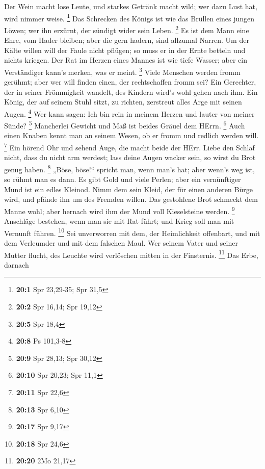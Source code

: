  Der Wein macht lose Leute, und starkes Getränk macht
wild; wer dazu Lust hat, wird nimmer weise. \footnote{\textbf{20:1} Spr
  23,29-35; Spr 31,5}  Das Schrecken des Königs ist wie
das Brüllen eines jungen Löwen; wer ihn erzürnt, der sündigt wider sein
Leben. \footnote{\textbf{20:2} Spr 16,14; Spr 19,12}  Es
ist dem Mann eine Ehre, vom Hader bleiben; aber die gern hadern, sind
allzumal Narren.  Um der Kälte willen will der Faule nicht
pflügen; so muss er in der Ernte betteln und nichts kriegen.
 Der Rat im Herzen eines Mannes ist wie tiefe Wasser; aber
ein Verständiger kann's merken, was er meint. \footnote{\textbf{20:5}
  Spr 18,4}  Viele Menschen werden fromm gerühmt; aber wer
will finden einen, der rechtschaffen fromm sei?  Ein
Gerechter, der in seiner Frömmigkeit wandelt, des Kindern wird's wohl
gehen nach ihm.  Ein König, der auf seinem Stuhl sitzt, zu
richten, zerstreut alles Arge mit seinen Augen. \footnote{\textbf{20:8}
  Ps 101,3-8}  Wer kann sagen: Ich bin rein in meinem
Herzen und lauter von meiner Sünde? \footnote{\textbf{20:9} Spr 28,13;
  Spr 30,12}  Mancherlei Gewicht und Maß ist beides
Gräuel dem HErrn. \footnote{\textbf{20:10} Spr 20,23; Spr 11,1}
 Auch einen Knaben kennt man an seinem Wesen, ob er fromm
und redlich werden will. \footnote{\textbf{20:11} Spr 22,6}
 Ein hörend Ohr und sehend Auge, die macht beide der
HErr.  Liebe den Schlaf nicht, dass du nicht arm werdest;
lass deine Augen wacker sein, so wirst du Brot genug haben. \footnote{\textbf{20:13}
  Spr 6,10}  „Böse, böse!{}`` spricht man, wenn man's
hat; aber wenn's weg ist, so rühmt man es dann.  Es gibt
Gold und viele Perlen; aber ein vernünftiger Mund ist ein edles Kleinod.
 Nimm dem sein Kleid, der für einen anderen Bürge wird,
und pfände ihn um des Fremden willen.  Das gestohlene
Brot schmeckt dem Manne wohl; aber hernach wird ihm der Mund voll
Kieselsteine werden. \footnote{\textbf{20:17} Spr 9,17} 
Anschläge bestehen, wenn man sie mit Rat führt; und Krieg soll man mit
Vernunft führen. \footnote{\textbf{20:18} Spr 24,6}  Sei
unverworren mit dem, der Heimlichkeit offenbart, und mit dem Verleumder
und mit dem falschen Maul.  Wer seinem Vater und seiner
Mutter flucht, des Leuchte wird verlöschen mitten in der Finsternis.
\footnote{\textbf{20:20} 2Mo 21,17}  Das Erbe, darnach
